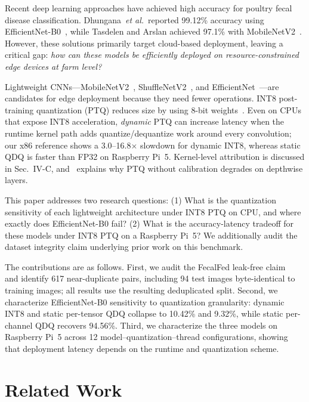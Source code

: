 \documentclass[conference,a4paper]{IEEEtran}
\begin{document}
Recent deep learning approaches have achieved high accuracy for poultry fecal disease classification. Dhungana~\textit{et al.}~reported 99.12\% accuracy using EfficientNet-B0~\cite{dhungana2025}, while Tasdelen and Arslan achieved 97.1\% with MobileNetV2~\cite{tasdelen2025}. However, these solutions primarily target cloud-based deployment, leaving a critical gap: \textit{how can these models be efficiently deployed on resource-constrained edge devices at farm level?}

Lightweight CNNs---MobileNetV2~\cite{mobilenetv2}, ShuffleNetV2~\cite{shufflenetv2}, and EfficientNet~\cite{efficientnet}---are candidates for edge deployment because they need fewer operations. INT8 post-training quantization (PTQ) reduces size by using 8-bit weights~\cite{jacob2018}. Even on CPUs that expose INT8 acceleration, \emph{dynamic} PTQ can increase latency when the runtime kernel path adds quantize/dequantize work around every convolution; our x86 reference shows a 3.0--16.8$\times$ slowdown for dynamic INT8, whereas static QDQ is faster than FP32 on Raspberry Pi~5. Kernel-level attribution is discussed in Sec.~IV-C, and~\cite{nagel2021} explains why PTQ without calibration degrades on depthwise layers.

This paper addresses two research questions: (1) What is the quantization sensitivity of each lightweight architecture under INT8 PTQ on CPU, and where exactly does EfficientNet-B0 fail? (2) What is the accuracy-latency tradeoff for these models under INT8 PTQ on a Raspberry Pi~5? We additionally audit the dataset integrity claim underlying prior work on this benchmark.

The contributions are as follows. First, we audit the FecalFed leak-free claim~\cite{chi2026} and identify 617 near-duplicate pairs, including 94 test images byte-identical to training images; all results use the resulting deduplicated split. Second, we characterize EfficientNet-B0 sensitivity to quantization granularity: dynamic INT8 and static per-tensor QDQ collapse to 10.42\% and 9.32\%, while static per-channel QDQ recovers 94.56\%. Third, we characterize the three models on Raspberry Pi~5 across 12 model--quantization--thread configurations, showing that deployment latency depends on the runtime and quantization scheme.

\section{Related Work}
\end{document}
